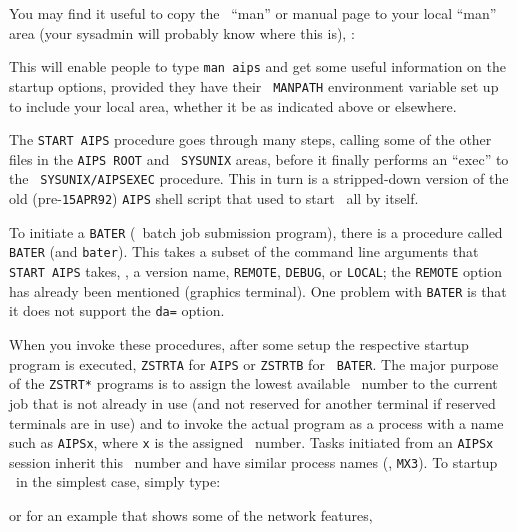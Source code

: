 You may find it useful to copy the \AIPS\ ``man'' or manual page to your
local ``man'' area (your sysadmin will probably know where this is), \eg:
\medskip

\medskip

\noindent This will enable people to type {\tt man aips} and get some
useful information on the startup options, provided they have their {\tt
MANPATH} environment variable set up to include your local area,
whether it be as indicated above or elsewhere.

The {\tt START AIPS} procedure goes through many steps, calling
some of the other files in the {\tt\dol AIPS ROOT} and {\tt\dol
SYSUNIX} areas, before it finally performs an ``exec'' to the {\tt\dol
SYSUNIX/AIPSEXEC} procedure.  This in turn is a stripped-down version of
the old (pre-{\tt 15APR92}) {\tt AIPS} shell script that used to start
\AIPS\ all by itself.

To initiate a {\tt BATER} (\AIPS\ batch job submission program), there
is a procedure called {\tt BATER} (and {\tt bater}).  This takes a
subset of the command line arguments that {\tt START AIPS} takes,
\ie, a version name, {\tt REMOTE}, {\tt DEBUG}, or {\tt LOCAL}; the
{\tt REMOTE} option has already been mentioned (graphics terminal).
One problem with {\tt BATER} is that it does not support the {\tt da=}
option.

When you invoke these procedures, after some setup the respective startup
program is executed, {\tt ZSTRTA} for {\tt AIPS} or {\tt ZSTRTB} for {\tt
BATER}.  The major purpose of the {\tt ZSTRT*} programs is to assign the
lowest available \POPS\ number to the current job that is not already in
use (and not reserved for another terminal if reserved terminals are in
use) and to invoke the actual program as a process with a name such as
{\tt AIPSx}, where {\tt x} is the assigned \POPS\ number.  Tasks initiated
from an {\tt AIPSx} session inherit this \POPS\ number and have similar
process names (\eg, {\tt MX3}).  To startup \AIPS\ in the simplest case,
simply type: \medskip

\medskip

\noindent or for an example that shows some of the network features,
\medskip


